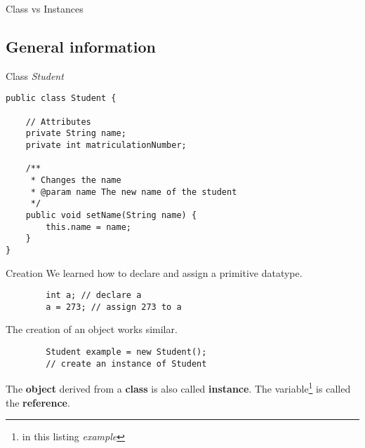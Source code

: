 \begin{frame}{}
	\begin{center}
		{\huge Class vs Instances}
	\end{center}
\end{frame}

\subsection{General information}

\begin{frame}[fragile]{Class \emph{Student}}
\begin{lstlisting}
public class Student {

	// Attributes
	private String name; 
	private int matriculationNumber; 
	
	/**
	 * Changes the name
	 * @param name The new name of the student
	 */
	public void setName(String name) {
		this.name = name;
	}
}
\end{lstlisting}



\end{frame}

\begin{frame}[fragile]{Creation}
	We learned how to declare and assign a primitive datatype.
	
	\begin{lstlisting}
	    int a; // declare a
	    a = 273; // assign 273 to a
	\end{lstlisting} 
	
	The creation of an object works similar.
	
	\begin{lstlisting}
	    Student example = new Student(); 
		// create an instance of Student
	\end{lstlisting}
	The \textbf{object} derived from a \textbf{class} is also called \textbf{instance}.
	The variable\footnote{in this listing \emph{example}} is called the \textbf{reference}.
\end{frame}

